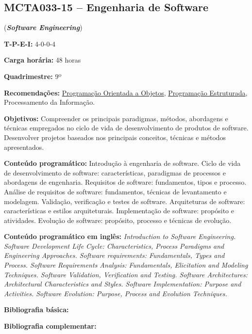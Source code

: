 \documentclass[12pt,a4paper]{article}
\begin{document}
\subsection*{MCTA033-15 -- Engenharia de Software}
\label{disc:es}

(\textbf{\textit{Software Engineering}})

\begin{center}
    \begin{minipage}{0.85\textwidth}
    
        \textbf{T-P-E-I:} 4-0-0-4
    
        \textbf{Carga horária:} 48 horas
        
        \textbf{Quadrimestre:} 9º 
        
        \textbf{Recomendações:} 
        \hyperref[disc:poo]{Programação Orientada a Objetos},
        \hyperref[disc:pe]{Programação Estruturada},
        Processamento da Informação.
        
    \end{minipage}
\end{center}

\textbf{Objetivos:}
Compreender os principais paradigmas, métodos, abordagens e técnicas empregados
no ciclo de vida de desenvolvimento de produtos de software. Desenvolver
projetos baseados nos principais conceitos, técnicas e métodos apresentados.

\textbf{Conteúdo programático:}
Introdução à engenharia de software.
Ciclo de vida de desenvolvimento de software: características, paradigmas de
processos e abordagens de engenharia.
Requisitos de software: fundamentos, tipos e processo.
Análise de requisitos de software: fundamentos, técnicas de levantamento e modelagem.
Validação, verificação e testes de software.
Arquiteturas de software: características e estilos arquiteturais.
Implementação de software: propósito e atividades.
Evolução de software: propósito, processo e técnicas de evolução. 

\textbf{Conteúdo programático em inglês:}
\textit{Introduction to Software Engineering. 
Software Development Life Cycle: Characteristics, Process Paradigms and Engineering Approaches. 
Software requirements: Fundamentals, Types and Process. 
Software Requirements Analysis: Fundamentals, Elicitation and Modeling Techniques. 
Software Validation, Verification and Testing. 
Software Architectures: Architectural Characteristics and Styles. 
Software Implementation: Purpose and Activities. 
Software Evolution: Purpose, Process and Evolution Techniques.}

\newrefsection
\textbf{Bibliografia básica:}
\nocite{2011-sommerville, 2020-valente, 2014-teles} 
\printbibliography

\newrefsection
\textbf{Bibliografia complementar:}
\nocite{2004-ambler, 2002-ambler, 2013-beck, 2004-fowler,  2009-martin}
\printbibliography
\end{document}
